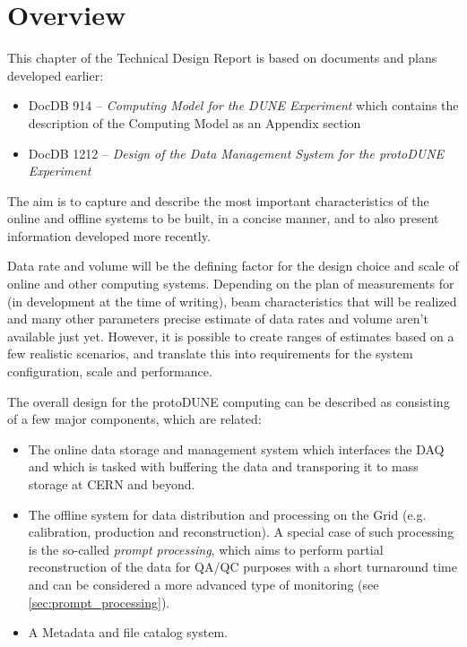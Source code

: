 \section{Overview}

This chapter of the Technical Design Report is based on documents and plans developed earlier:
\begin{itemize}
\item DocDB 914 --  \textit{Computing Model for the DUNE Experiment}  which contains the
description of the \pd Computing Model as an Appendix section

\item DocDB 1212 -- \textit{Design of the Data Management System for the
protoDUNE Experiment}

\end{itemize}

\noindent The aim is to capture and describe the most important characteristics of the online and offline systems to be built, in a concise manner,
and to also present information developed more recently.

Data rate and volume will be the defining factor for the design choice and scale of \pd
online and other computing systems. Depending on the plan of measurements for \pd
(in development at the time of writing), beam characteristics that will be realized
and many other parameters precise estimate of data rates and volume aren't available just yet. However, it is possible to create ranges
of estimates based on a few realistic scenarios, and translate this into requirements for the system configuration, scale and
performance.

The overall design for the protoDUNE computing can be described as consisting of a few major components, which are related:
\begin{itemize}

\item The online data storage and management system which interfaces the DAQ and which is tasked with buffering
the data and transporing it to mass storage at CERN and beyond.

\item The offline system for data distribution and processing on the Grid (e.g. calibration, production and reconstruction). A special case
of such processing is the so-called \textit{prompt processing}, which aims to perform partial reconstruction of the data for QA/QC purposes
with a short turnaround time and can be considered a more advanced type of monitoring (see\,\ref{sec:prompt_processing}).

\item  A Metadata and file catalog system.
\end{itemize}




